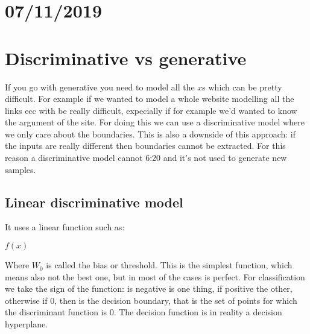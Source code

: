 \chapter{07/11/2019}
\chapter{Discriminative vs generative}
If you go with generative you need to model all the $x$s which can be pretty difficult. For example if we wanted to model a whole website modelling all the links ecc with be really difficult, expecially if for example we'd wanted to know the argument of the site. For doing this we can use a discriminative model where we only care about the boundaries. This is also a downside of this approach: if the inputs are really different then boundaries cannot be extracted. For this reason a discriminative model cannot 6:20 and it's not used to generate new samples. 
\section{Linear discriminative model}
It uses a linear function such as:
\begin{center}
	$\displaystyle f(x)$
\end{center}
Where $W_0$ is called the bias or threshold. \newline
This is the simplest function, which means also not the best one, but in most of the cases is perfect.\newline
For classification we take the sign of the function: is negative is one thing, if positive the other, otherwise if 0, then is the decision boundary, that is the set of points for which the discriminant function is 0. \newline
The decision function is in reality a decision hyperplane. 
